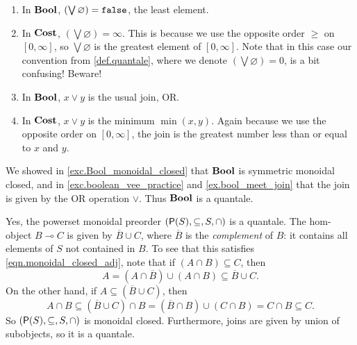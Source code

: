 \documentclass[7Sketches]{subfiles}
\begin{document}
{
\begin{enumerate}
	\item[1a.] In $\mathbf{Bool}$, $(\bigvee\varnothing) = \mathtt{false}$, the least element.
	\item[1b.] In $\mathbf{Cost}$, $(\bigvee\varnothing) = \infty$. This is because we
	use the opposite order $\ge$ on $[0,\infty]$, so $\bigvee\varnothing$ is
	the greatest element of $[0,\infty]$. Note that in this case our
	convention from \cref{def.quantale}, where we denote $(\bigvee\varnothing) = 0$, is a bit confusing! Beware!
	\item[2a.] In $\mathbf{Bool}$, $x \vee y$ is the usual join, OR. 
	\item[2b.] In $\mathbf{Cost}$, $x \vee y$ is the minimum $\min(x,y)$. Again
	because we use the opposite order on $[0,\infty]$, the join is the
	greatest number less than or equal to $x$ and $y$.
\end{enumerate}
}

{
We showed in \cref{exc.Bool_monoidal_closed} that $\mathbf{Bool}$ is symmetric
monoidal closed, and in \cref{exc.boolean_vee_practice} and
\cref{ex.bool_meet_join} that the join is given by the OR operation $\vee$.
Thus $\mathbf{Bool}$ is a quantale.
}

{
Yes, the powerset monoidal preorder $(\mathsf{P}(S),\subseteq,S,\cap)$ is a quantale. The
hom-object $B \multimap C$ is given by $\overline{B} \cup C$, where $\overline
B$ is the \emph{complement} of $B$: it contains all elements of $S$ not
contained in $B$. To see that this satisfies \cref{eqn.monoidal_closed_adj},
note that if $(A \cap B) \subseteq C$, then
\[
A = (A \cap \overline B) \cup (A \cap B) \subseteq \overline B \cup C.
\]
On the other hand, if $A \subseteq (\overline B \cup C)$, then
\[
A \cap B \subseteq (\overline B \cup C) \cap B = (\overline B \cap B) \cup (C \cap B) = C \cap B \subseteq C.
\]
So $(\mathsf{P}(S),\subseteq,S,\cap)$ is monoidal closed. Furthermore, joins are given by union of subobjects,
so it is a quantale.
}
\end{document}
